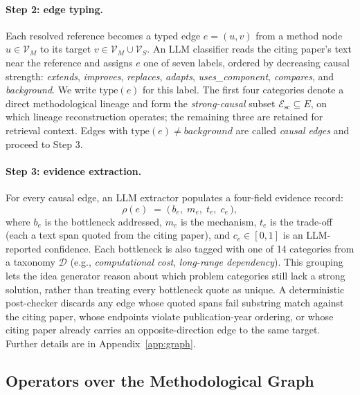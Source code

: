 \documentclass{llmxive}
\begin{document}
\paragraph{Step 2: edge typing.}
Each resolved reference becomes a typed edge $e = (u, v)$ from a method node $u \in \mathcal{V}_M$ to its target $v \in \mathcal{V}_M \cup \mathcal{V}_S$. An LLM classifier reads the citing paper's text near the reference and assigns $e$ one of seven labels, ordered by decreasing causal strength: \emph{extends}, \emph{improves}, \emph{replaces}, \emph{adapts}, \emph{uses\_component}, \emph{compares}, and \emph{background}. We write $\text{type}(e)$ for this label. The first four categories denote a direct methodological lineage and form the \emph{strong-causal} subset $\mathcal{E}_{\text{sc}} \subseteq E$, on which lineage reconstruction operates; the remaining three are retained for retrieval context. Edges with $\text{type}(e) \neq \textit{background}$ are called \emph{causal edges} and proceed to Step 3.

\paragraph{Step 3: evidence extraction.}
For every causal edge, an LLM extractor populates a four-field evidence record:
\begin{equation}
\rho(e) \;=\; \bigl(\,b_e,\;m_e,\;t_e,\;c_e\,\bigr),
\label{eq:rho}
\end{equation}
where $b_e$ is the bottleneck addressed, $m_e$ is the mechanism, $t_e$ is the trade-off (each a text span quoted from the citing paper), and $c_e \in [0, 1]$ is an LLM-reported confidence. Each bottleneck is also tagged with one of 14 categories from a taxonomy $\mathcal{D}$ (e.g., \emph{computational cost}, \emph{long-range dependency}). This grouping lets the idea generator reason about which problem categories still lack a strong solution, rather than treating every bottleneck quote as unique. A deterministic post-checker discards any edge whose quoted spans fail substring match against the citing paper, whose endpoints violate publication-year ordering, or whose citing paper already carries an opposite-direction edge to the same target. Further details are in Appendix~\ref{app:graph}.


\subsection{Operators over the Methodological Graph}
\label{sec:operators}
\end{document}
